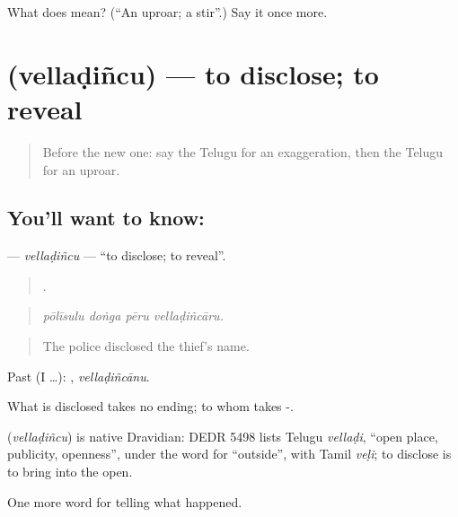 \begin{tcolorbox}[breakable,colback=teal!4,colframe=teal!35!black,title={Before you move on}]
What does  mean? (\textquotedblleft{}An uproar; a stir\textquotedblright{}.) Say it once more.
\end{tcolorbox}
\section[\texorpdfstring{\te{వెల్లడించు} (vellaḍiñcu)}{వెల్లడించు (vellaḍiñcu)}]{ (vellaḍiñcu) — to disclose; to reveal}

\label{lesson:TE-C336-velladincu}



\begin{quote}
Before the new one: say the Telugu for an exaggeration, then the Telugu for an uproar.
\end{quote}

\subsection*{You'll want to know: }
\textbf{} — \emph{vellaḍiñcu} — \textquotedblleft{}to disclose; to reveal\textquotedblright{}.

\begin{quote}
   .
\end{quote}

\begin{quote}
\emph{pōlīsulu doṅga pēru vellaḍiñcāru.}
\end{quote}

\begin{quote}
The police disclosed the thief's name.
\end{quote}

Past (I …): , \emph{vellaḍiñcānu}.

What is disclosed takes no ending; to whom takes -.

\begin{cousinweb}
\textbf{} (\emph{vellaḍiñcu}) is native Dravidian: DEDR 5498 lists Telugu \emph{vellaḍi}, \textquotedblleft{}open place, publicity, openness\textquotedblright{}, under the word for \textquotedblleft{}outside\textquotedblright{}, with Tamil \emph{veḷi}; to disclose is to bring into the open.
\end{cousinweb}

\begin{grammarlens}[title={What you've built}]
One more word for telling what happened.
\end{grammarlens}

